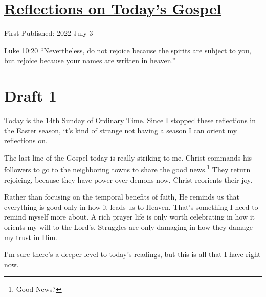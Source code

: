 \documentclass[12pt]{article}[titlepage]
\newcommand{\say}[1]{``#1''}
\newcommand{\1}{\={a}}
\newcommand{\2}{\={e}}
\newcommand{\3}{\={\i}}
\newcommand{\4}{\=o}
\newcommand{\5}{\=u}
\newcommand{\6}{\={A}}
\renewcommand{\,}{\textsuperscript{,}}
\begin{document}
\doublespacing
\section{\href{reflections-on-readings-14-ordinary-c-22.html}{Reflections on Today's Gospel}}
First Published: 2022 July 3

Luke 10:20 \say{Nevertheless, do not rejoice because the spirits are subject to you, but rejoice because your names are written in heaven.}

\section{Draft 1}
Today is the 14th Sunday of Ordinary Time.
Since I stopped these reflections in the Easter season, it's kind of strange not having a season I can orient my reflections on.

The last line of the Gospel today is really striking to me.
Christ commands his followers to go to the neighboring towns to share the good news.\footnote{Good News?}
They return rejoicing, because they have power over demons now.
Christ reorients their joy.

Rather than focusing on the temporal benefits of faith, He reminds us that everything is good only in how it leads us to Heaven.
That's something I need to remind myself more about.
A rich prayer life is only worth celebrating in how it orients my will to the Lord's.
Struggles are only damaging in how they damage my trust in Him.

I'm sure there's a deeper level to today's readings, but this is all that I have right now.
\end{document}
